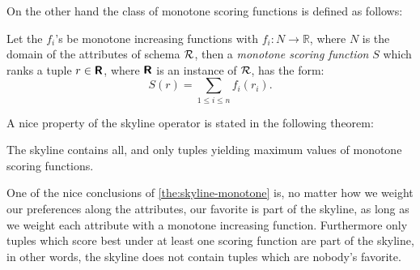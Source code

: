 \bigskip
\noindent
On the other hand the class of monotone scoring functions is defined as follows:

\begin{definition}
Let the $f_i$'s be monotone increasing functions with $f_i\colon N
\rightarrow \mathbb{R}$, where $N$ is the domain of the attributes of
schema $\mathcal{R}$, then a \emph{monotone scoring function} $S$ which
ranks a tuple $r \in \textnormal{\bf\textsf{R}}$, where $\textnormal{\bf\textsf{R}}$ is an instance
of $\mathcal{R}$, has the form:
\[
S(r) = \sum_{1 \le i \le n} f_i(r_i).
\]
\end{definition}

\noindent
A nice property of the skyline operator is stated in the following
theorem:

\begin{theorem}
\label{the:skyline-monotone}
The skyline contains all, and only tuples yielding maximum values of
monotone scoring functions.
\end{theorem}

One of the nice conclusions of \autoref{the:skyline-monotone} is, no
matter how we weight our preferences along the attributes, our
favorite is part of the skyline, as long as we weight each attribute with
a monotone increasing function.  Furthermore only tuples which
score best under at least one scoring function are part of
the skyline, in other words, the skyline does not contain tuples which
are nobody's favorite.




